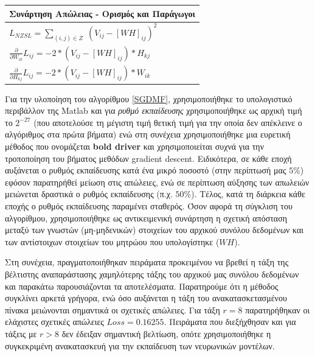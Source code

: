 \bigskip
\begingroup
\centering
\newcommand\T{\rule{0pt}{2.6ex}} %
\newcommand\B{\rule[-1.2ex]{0pt}{0pt}} %
\begin{tabularx}{\textwidth} { 
  | >{\centering\arraybackslash}X 
  |  }
 \hline
 \textbf{Συνάρτηση Απώλειας - Ορισμός και Παράγωγοι }\T\B  \\
 \hline
 \LARGE $ L_{NZSL} = \sum_{(i,j) \in Z} \; (V_{ij} - [WH]_{ij})^2$ \T\B \\
 \LARGE $\frac{\partial}{\partial W_{ik}} L_{ij} = -2*(V_{ij} - [WH]_{ij})*H_{kj}$ \T\B \\
 \LARGE $\frac{\partial}{\partial H_{kj}} L_{ij} = -2*(V_{ij} - [WH]_{ij})*W_{ik}$ \T\B \\
 \hline
\end{tabularx}
\label{Συνάρτηση Απώλειας - Ορισμός και Παράγωγοι}
\endgroup

\medskip
Για την υλοποίηση του αλγορίθμου \ref{SGDMF}, χρησιμοποιήθηκε το υπολογιστικό περιβάλλον της Matlab και για \textit{ρυθμό εκπαίδευσης} χρησιμοποιήθηκε ως αρχική τιμή το $2^{-27}$ (που αποτελούσε τη μέγιστη τιμή θετική τιμή για την οποία δεν απέκλεινε ο αλγόριθμος στα πρώτα βήματα) ενώ στη συνέχεια χρησιμοποιήθηκε μια ευρετική μέθοδος που ονομάζεται \textbf{bold driver} και χρησιμοποιείται συχνά για την τροποποίηση του βήματος μεθόδων gradient descent. Ειδικότερα, σε κάθε εποχή αυξάνεται ο ρυθμός εκπαίδευσης κατά ένα μικρό ποσοστό (στην περίπτωσή μας $5\%$) εφόσον παρατηρήθεί μείωση στις απώλειες, ενώ σε περίπτωση αύξησης των απωλειών μειώνεται δραστικά ο ρυθμός εκπαίδευσης (π.χ. $50\%$). Τέλος, κατά τη διάρκεια κάθε εποχής ο ρυθμός εκπαίδευσης παραμένει σταθερός. Όσον αφορά τη σύγκλιση του αλγορίθμου, χρησιμοποιήθηκε ως αντικειμενική συνάρτηση η σχετική απόσταση μεταξύ των γνωστών (μη-μηδενικών) στοιχείων του αρχικού συνόλου δεδομένων και των αντίστοιχων στοιχείων του μητρώου που υπολογίστηκε ($WH$).


Στη συνέχεια, πραγματοποιήθηκαν πειράματα προκειμένου να βρεθεί η τάξη της βέλτιστης αναπαράστασης χαμηλότερης τάξης του αρχικού μας συνόλου δεδομένων και παρακάτω παρουσιάζονται τα αποτελέσματα. Παρατηρούμε ότι η μέθοδος συγκλίνει αρκετά γρήγορα, ενώ όσο αυξάνεται η τάξη του ανακατασκετασμένου πίνακα μειώνονται σημαντικά οι σχετικές απώλειες. Για τάξη $r=8$ παρατηρήθηκαν οι ελάχιστες σχετικές απώλειες $Loss = 0.16255$. Πειράματα που διεξήχθησαν και για τάξεις με $ r > 8$ δεν έδειξαν σημαντική βελτίωση, οπότε χρησιμοποιήθηκε η συγκεκριμένη ανακατασκευή για την εκπαίδευση των νευρωνικών μοντέλων.

